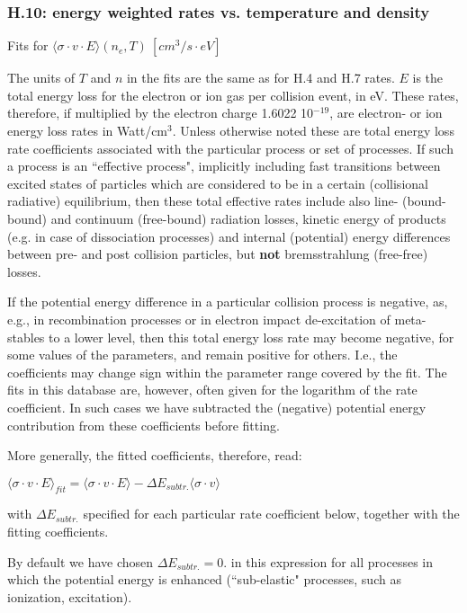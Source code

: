 \documentclass[12pt,dvipdfmx]{article}
\begin{document}
\subsubsection{H.10: energy weighted rates vs. temperature and density}\label{sec1.3.10}
Fits for $\langle\sigma \cdot v \cdot E \rangle (n_e,T) \ [cm^3/s \cdot eV]$

The units of $T$ and $n$ in the fits are the same as for H.4 and H.7
rates. $E$ is the total energy loss for the electron or ion gas per
collision event, in eV. These rates, therefore, if multiplied by the
electron charge 1.6022 10$^{-19}$, are electron- or ion energy loss
rates in Watt/cm$^3$. Unless otherwise noted these are total energy
loss rate coefficients associated with the particular process or set of processes. If
such a process is an ``effective process", implicitly including fast
transitions between excited states of particles which are considered
to be in a certain (collisional radiative) equilibrium, then these
total effective rates include also line- (bound-bound) and continuum
(free-bound) radiation losses, kinetic energy of products (e.g. in
case of dissociation processes) and internal (potential) energy
differences between pre- and post collision particles, but {\bf not}
bremsstrahlung (free-free) losses.

If the potential energy difference in a particular collision process
is negative, as, e.g., in recombination processes
or in electron impact de-excitation of meta-stables to a lower level,
then this total energy loss rate
may become negative, for some values of the parameters,
and remain positive for others.
I.e., the coefficients may change sign within the parameter
range covered by the fit.
The fits in this database are, however, often given for the logarithm of the
rate coefficient. In such cases we have subtracted the (negative) potential energy
contribution from these coefficients before fitting.

More generally, the fitted coefficients, therefore, read:

$\langle\sigma \cdot v \cdot E \rangle_{fit} = \langle\sigma \cdot v \cdot E \rangle - \Delta E_{subtr.} \langle\sigma \cdot v \rangle$

with $\Delta E_{subtr.} $ specified for each particular rate coefficient below, together
with the fitting coefficients.

By default we have chosen $\Delta E_{subtr.} = 0.$ in this expression
for all processes in which the potential energy is
enhanced (``sub-elastic" processes, such as ionization, excitation).
\end{document}
